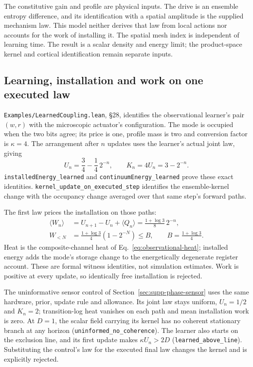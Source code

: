 \documentclass{article}
\begin{document}
The constitutive gain and profile are physical inputs. The drive is an
ensemble entropy difference, and its identification with a spatial amplitude
is the supplied mechanism law. This model neither derives that law from local
actions nor accounts for the work of installing it. The spatial mesh index is
independent of learning time. The result is a scalar density and energy limit;
the product-space kernel and cortical identification remain separate inputs.

\subsection{Learning, installation and work on one executed law}
\label{sec:supp-learned-installation}

\nolinkurl{Examples/LearnedCoupling.lean}, \S28, identifies the
observational learner's pair $(w,r)$ with the microscopic actuator's
configuration. The mode is occupied when the two bits agree; its price is one,
profile mass is two and conversion factor is $\kappa=4$. The arrangement
after $n$ updates uses the learner's actual joint law, giving
\begin{equation}
 U_n=\frac34-\frac14\,2^{-n},\qquad
 K_n=4U_n=3-2^{-n}.
 \label{eq:learned-installation}
\end{equation}
\nolinkurl{installedEnergy_learned} and
\nolinkurl{continuumEnergy_learned} prove these exact identities.
\nolinkurl{kernel_update_on_executed_step}
identifies the ensemble-kernel change with the occupancy change averaged over
that same step's forward paths.

The first law prices the installation on those paths:
\begin{align}
 \langle W_n\rangle
 &=U_{n+1}-U_n+\langle Q_n\rangle
   =\frac{1+\log3}{8}\,2^{-n},\\
 W_{<N}&=\frac{1+\log3}{4}(1-2^{-N})
          \leq B,\qquad B=\frac{1+\log3}{4}.
 \label{eq:learned-installation-work}
\end{align}
Heat is the composite-channel heat of Eq.~\eqref{eq:observational-heat};
installed energy adds the mode's storage change to the energetically
degenerate register account. These are formal witness identities, not
simulation estimates. Work is positive at every update, so identically free
installation is rejected.

The uninformative sensor control of Section~\ref{sec:supp-phase-sensor} uses
the same hardware, prior, update rule and allowance. Its joint law stays
uniform, $U_n=1/2$ and $K_n=2$; transition-log heat vanishes on each path and
mean installation work is zero. At $D=1$, the scalar field carrying its kernel
has no coherent stationary branch at any horizon
(\nolinkurl{uninformed_no_coherence}). The learner also
starts on the exclusion line, and its first update makes
$\kappa U_n>2D$ (\nolinkurl{learned_above_line}).
Substituting the control's law for the executed final law changes the kernel
and is explicitly rejected.
\end{document}
